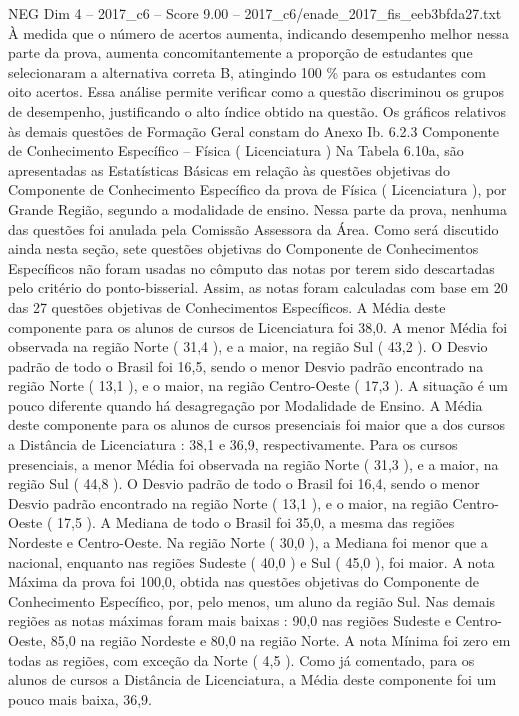\begin{textsample}{NEG Dim 4 – 2017\_c6 – Score 9.00 – 2017\_c6/enade\_2017\_fis\_eeb3bfda27.txt}
À medida que o número de acertos aumenta, indicando desempenho melhor nessa parte da prova, aumenta concomitantemente a proporção de estudantes que selecionaram a alternativa correta B, atingindo 100 \% para os estudantes com oito acertos.
Essa análise permite verificar como a questão discriminou os grupos de desempenho, justificando o alto índice obtido na questão.
Os gráficos relativos às demais questões de Formação Geral constam do Anexo Ib. 6.2.3 Componente de Conhecimento Específico – Física ( Licenciatura ) Na Tabela 6.10a, são apresentadas as Estatísticas Básicas em relação às questões objetivas do Componente de Conhecimento Específico da prova de Física ( Licenciatura ), por Grande Região, segundo a modalidade de ensino.
Nessa parte da prova, nenhuma das questões foi anulada pela Comissão Assessora da Área.
Como será discutido ainda nesta seção, sete questões objetivas do Componente de Conhecimentos Específicos não foram usadas no cômputo das notas por terem sido descartadas pelo critério do ponto-bisserial.
Assim, as notas foram calculadas com base em 20 das 27 questões objetivas de Conhecimentos Específicos.
A Média deste componente para os alunos de cursos de Licenciatura foi 38,0.
A menor Média foi observada na região Norte ( 31,4 ), e a maior, na região Sul ( 43,2 ).
O Desvio padrão de todo o Brasil foi 16,5, sendo o menor Desvio padrão encontrado na região Norte ( 13,1 ), e o maior, na região Centro-Oeste ( 17,3 ).
A situação é um pouco diferente quando há desagregação por Modalidade de Ensino.
A Média deste componente para os alunos de cursos presenciais foi maior que a dos cursos a Distância de Licenciatura : 38,1 e 36,9, respectivamente.
Para os cursos presenciais, a menor Média foi observada na região Norte ( 31,3 ), e a maior, na região Sul ( 44,8 ).
O Desvio padrão de todo o Brasil foi 16,4, sendo o menor Desvio padrão encontrado na região Norte ( 13,1 ), e o maior, na região Centro-Oeste ( 17,5 ).
A Mediana de todo o Brasil foi 35,0, a mesma das regiões Nordeste e Centro-Oeste.
Na região Norte ( 30,0 ), a Mediana foi menor que a nacional, enquanto nas regiões Sudeste ( 40,0 ) e Sul ( 45,0 ), foi maior.
A nota Máxima da prova foi 100,0, obtida nas questões objetivas do Componente de Conhecimento Específico, por, pelo menos, um aluno da região Sul.
Nas demais regiões as notas máximas foram mais baixas : 90,0 nas regiões Sudeste e Centro-Oeste, 85,0 na região Nordeste e 80,0 na região Norte.
A nota Mínima foi zero em todas as regiões, com exceção da Norte ( 4,5 ).
Como já comentado, para os alunos de cursos a Distância de Licenciatura, a Média deste componente foi um pouco mais baixa, 36,9.

\end{textsample}

